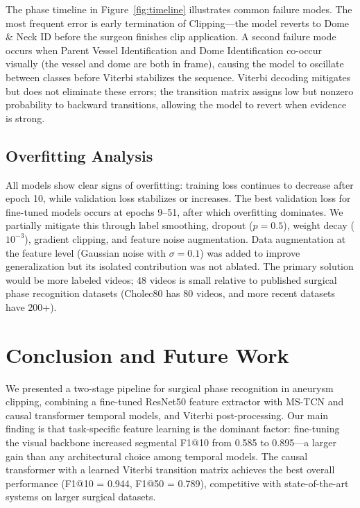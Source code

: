 \documentclass[10pt,twocolumn]{article}
\begin{document}
The phase timeline in Figure~\ref{fig:timeline} illustrates common failure modes. The most frequent error is early termination of Clipping—the model reverts to Dome \& Neck ID before the surgeon finishes clip application. A second failure mode occurs when Parent Vessel Identification and Dome Identification co-occur visually (the vessel and dome are both in frame), causing the model to oscillate between classes before Viterbi stabilizes the sequence. Viterbi decoding mitigates but does not eliminate these errors; the transition matrix assigns low but nonzero probability to backward transitions, allowing the model to revert when evidence is strong.

\subsection{Overfitting Analysis}

All models show clear signs of overfitting: training loss continues to decrease after epoch 10, while validation loss stabilizes or increases. The best validation loss for fine-tuned models occurs at epochs 9--51, after which overfitting dominates. We partially mitigate this through label smoothing, dropout ($p = 0.5$), weight decay ($10^{-3}$), gradient clipping, and feature noise augmentation. Data augmentation at the feature level (Gaussian noise with $\sigma = 0.1$) was added to improve generalization but its isolated contribution was not ablated. The primary solution would be more labeled videos; 48 videos is small relative to published surgical phase recognition datasets (Cholec80 \cite{twinanda2016endonet} has 80 videos, and more recent datasets have 200+).

\section{Conclusion and Future Work}

We presented a two-stage pipeline for surgical phase recognition in aneurysm clipping, combining a fine-tuned ResNet50 feature extractor with MS-TCN and causal transformer temporal models, and Viterbi post-processing. Our main finding is that task-specific feature learning is the dominant factor: fine-tuning the visual backbone increased segmental F1@10 from 0.585 to 0.895—a larger gain than any architectural choice among temporal models. The causal transformer with a learned Viterbi transition matrix achieves the best overall performance (F1@10 = 0.944, F1@50 = 0.789), competitive with state-of-the-art systems on larger surgical datasets.
\end{document}
